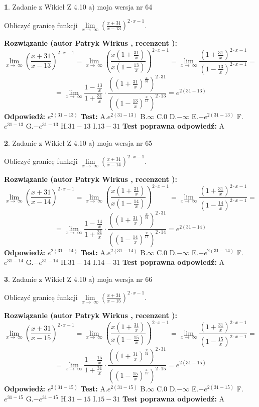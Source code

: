 \documentclass[12pt, a4paper]{article}
\theoremstyle{definition} %
\newtheorem{zad}{}
\newcommand{\zadStart}[1]{\begin{zad}#1\newline}
\newcommand{\zadStop}{\end{zad}}
\newcommand{\rozwStart}[2]{\noindent \textbf{Rozwiązanie (autor #1 , recenzent #2): }\newline}
\newcommand{\rozwStop}{\newline}
\newcommand{\odpStart}{\noindent \textbf{Odpowiedź:}\newline}
\newcommand{\odpStop}{\newline}
\newcommand{\testStart}{\noindent \textbf{Test:}\newline}
\newcommand{\testStop}{\newline}
\newcommand{\kluczStart}{\noindent \textbf{Test poprawna odpowiedź:}\newline}
\newcommand{\kluczStop}{\newline}
\begin{document}
\zadStart{Zadanie z Wikieł Z 4.10 a) moja wersja nr 64}


Obliczyć granicę funkcji  $\lim\limits_{x\to\ \infty}(\frac{x+31}{x-13})^{2\cdot x-1}$.
\zadStop
\rozwStart{Patryk Wirkus}{}
$$\lim\limits_{x\to\ \infty}(\frac{x+31}{x-13})^{2\cdot x-1} = \lim\limits_{x\to\ \infty}(\frac{x(1+\frac{31}{x})}{x(1-\frac{13}{x})})^{2\cdot x-1}=\lim\limits_{x\to\ \infty}\frac{(1+\frac{31}{x})^{2\cdot x-1}}{(1-\frac{13}{x})^{2\cdot x-1}}=$$
$$=\lim\limits_{x\to\ \infty}\frac{1-\frac{13}{x}}{1+\frac{31}{x}}\cdot\frac{((1+\frac{31}{x})^{\frac{x}{31}})^{2\cdot31}}{((1-\frac{13}{x})^{\frac{x}{13}})^{2\cdot13}}=e^{2(31-13)}$$
\rozwStop
\odpStart
$e^{2(31-13)}$
\odpStop
\testStart
A.$e^{2(31-13)}$ B.$\infty$ C.$0$ D.$-\infty$ E.$-e^{2(31-13)}$
F.$e^{31-13}$ G.$-e^{31-13}$
H.$31-13$
I.$13-31$
\testStop
\kluczStart
A
\kluczStop



\zadStart{Zadanie z Wikieł Z 4.10 a) moja wersja nr 65}


Obliczyć granicę funkcji  $\lim\limits_{x\to\ \infty}(\frac{x+31}{x-14})^{2\cdot x-1}$.
\zadStop
\rozwStart{Patryk Wirkus}{}
$$\lim\limits_{x\to\ \infty}(\frac{x+31}{x-14})^{2\cdot x-1} = \lim\limits_{x\to\ \infty}(\frac{x(1+\frac{31}{x})}{x(1-\frac{14}{x})})^{2\cdot x-1}=\lim\limits_{x\to\ \infty}\frac{(1+\frac{31}{x})^{2\cdot x-1}}{(1-\frac{14}{x})^{2\cdot x-1}}=$$
$$=\lim\limits_{x\to\ \infty}\frac{1-\frac{14}{x}}{1+\frac{31}{x}}\cdot\frac{((1+\frac{31}{x})^{\frac{x}{31}})^{2\cdot31}}{((1-\frac{14}{x})^{\frac{x}{14}})^{2\cdot14}}=e^{2(31-14)}$$
\rozwStop
\odpStart
$e^{2(31-14)}$
\odpStop
\testStart
A.$e^{2(31-14)}$ B.$\infty$ C.$0$ D.$-\infty$ E.$-e^{2(31-14)}$
F.$e^{31-14}$ G.$-e^{31-14}$
H.$31-14$
I.$14-31$
\testStop
\kluczStart
A
\kluczStop



\zadStart{Zadanie z Wikieł Z 4.10 a) moja wersja nr 66}


Obliczyć granicę funkcji  $\lim\limits_{x\to\ \infty}(\frac{x+31}{x-15})^{2\cdot x-1}$.
\zadStop
\rozwStart{Patryk Wirkus}{}
$$\lim\limits_{x\to\ \infty}(\frac{x+31}{x-15})^{2\cdot x-1} = \lim\limits_{x\to\ \infty}(\frac{x(1+\frac{31}{x})}{x(1-\frac{15}{x})})^{2\cdot x-1}=\lim\limits_{x\to\ \infty}\frac{(1+\frac{31}{x})^{2\cdot x-1}}{(1-\frac{15}{x})^{2\cdot x-1}}=$$
$$=\lim\limits_{x\to\ \infty}\frac{1-\frac{15}{x}}{1+\frac{31}{x}}\cdot\frac{((1+\frac{31}{x})^{\frac{x}{31}})^{2\cdot31}}{((1-\frac{15}{x})^{\frac{x}{15}})^{2\cdot15}}=e^{2(31-15)}$$
\rozwStop
\odpStart
$e^{2(31-15)}$
\odpStop
\testStart
A.$e^{2(31-15)}$ B.$\infty$ C.$0$ D.$-\infty$ E.$-e^{2(31-15)}$
F.$e^{31-15}$ G.$-e^{31-15}$
H.$31-15$
I.$15-31$
\testStop
\kluczStart
A
\kluczStop
\end{document}
